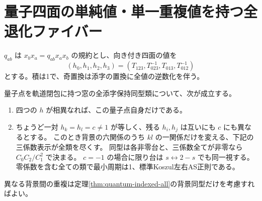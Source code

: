 \section{量子四面の単純値・単一重複値を持つ全退化ファイバー}
\label{sec:quantum-face-resonance}
$q_{ab}$ は $x_bx_a=q_{ab}x_ax_b$ の規約とし、向き付き四面の値を
\[
 (h_0,h_1,h_2,h_3)=(T_{123},T_{023}^{-1},T_{013},T_{012}^{-1})
\]
とする。積は1で、奇置換は添字の置換に全値の逆数化を伴う。
\begin{theorem}\label{thm:quantum-face-resonance}
量子点を軌道閉包に持つ窓の全添字保持同型類について、次が成立する。
\begin{enumerate}
\item 四つの $h$ が相異なれば、この量子点自身だけである。
\item ちょうど一対 $h_k=h_l=c\ne1$ が等しく、残る $h_i,h_j$ は互いにも $c$ にも異なるとする。
このとき背景の六関係のうち $kl$ の一関係だけを変える、下記の三係数表示が全類を尽くす。
同型は各非零台と、三係数全てが非零なら $C_0C_2/C_1^2$ で決まる。
$c=-1$ の場合に限り台は $s\leftrightarrow2-s$ でも同一視する。
零係数を含む全ての類で最小周期は1、標準Koszul左右AS正則である。
\end{enumerate}
異なる背景間の重複は定理\ref{thm:quantum-indexed-all}の背景同型だけを考慮すればよい。
\end{theorem}

